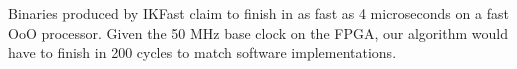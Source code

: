 Binaries produced by IKFast claim to finish in as fast as 4 microseconds on a fast OoO processor. Given the 50 MHz base clock on the FPGA, our algorithm would have to finish in 200 cycles to match software implementations.
